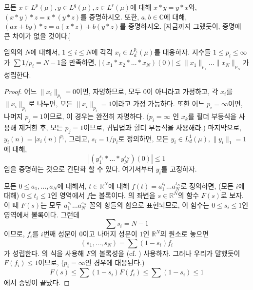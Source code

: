 \begin{exercise}
    모든 $x \in L^p(\mu), y \in L^q(\mu), z \in L^r(\mu)$에 대해 $x * y = y * x$와, $(x * y) * z = x * (y * z)$를 증명하시오.
    또한, $a, b \in \mathbb{C}$에 대해, $(ax + by) * z = a (x * z) + b (y * z)$를 증명하시오. [지금까지 그랬듯이, 증명에 큰 차이가 없을 것이다.]
\end{exercise}

\begin{lemma}
\label{lem:youngineq2}
    임의의 $N$에 대해서, $1 \leq i \leq N$에 각각 $x_i \in L^{p_i}_d(\mu)$를 대응하자.
    지수들 $1 \leq p_i \leq \infty$가 $\sum 1/p_i = N - 1$을 만족하면, $|(x_1 * x_2 * \dots * x_N)(0)| \leq \|x_1\|_{p_1} \dots \|x_N\|_{p_N}$가 성립한다.
\end{lemma}
\begin{proof}
    어느 $\|x_i\|_{p_i} = 0$이면, 자명하므로, 모두 $0$이 아니라고 가정하고, 각 $x_i$를 $\|x_i\|_{p_i}$로 나누면, 모든 $\|x_i\|_{p_i} = 1$이라고 가정 가능하다.
    또한 어느 $p_i = \infty$이면, 나머지 $p_j = 1$이므로, 이 경우는 완전히 자명하다. ($p_i = \infty$ 인 $x_k$를 횔더 부등식을 사용해 제거한 후, 모든 $p_j = 1$이므로, 귀납법과 횔더 부등식을 사용해라.)
    마지막으로, $y_i(n) = |x_i(n)|^{p_i}$, 그리고, $s_i = 1/p_i$로 정의하면, 모든 $y_i \in L^1_d(\mu), \|y_i\|_1 = 1$에 대해,
    \begin{equation}
    \label{eq:youngineq1}
        |(y_1^{s_1} * \dots * y_N^{s_N})(0)| \leq 1
    \end{equation}
    임을 증명하는 것으로 간단화 할 수 있다.
    여기서부터 $y_i$를 고정하자.
    
    모든 $0 \leq a_1, \dots, a_N$에 대해서, $t \in \mathbb{R}^N$에 대해 $f(t) = a_1^{t_1} \dots a_N^{t_N}$로 정의하면, (모든 $i$에 대해) $0 \leq t_i \leq 1$인 영역에서 $f$는 볼록이다.
    의 좌변을 $s \in \mathbb{R}^N$의 함수 $F(s)$로 보자.
    이 때 $F(s)$는 모두 $a_1^{s_1} \dots a_N^{s_N}$ 꼴의 항들의 합으로 표현되므로, 이 함수는 $0 \leq s_i \leq 1$인 영역에서 볼록이다.
    그런데
    \begin{equation*}
        \sum s_i = N - 1
    \end{equation*}
    이므로, $f_i$를 $i$번째 성분이 $0$이고 나머지 성분이 $1$인 $\mathbb{R}^N$의 원소로 놓으면
    \begin{equation}
    \label{eq:youngineq2}
        (s_1, \dots, s_N) = \sum (1 - s_i) f_i
    \end{equation}
    가 성립한다.
    의 식을 사용해 $F$의 볼록성을 (cf. ) 사용하자.
    그러나 우리가 말했듯이 $F(f_i) \leq 1$이므로, ($p_i = \infty$인 경우에 대응된다.)
    \begin{equation*}
        F(s) \leq \sum (1 - s_i) F(f_i) \leq \sum (1 - s_i) \leq 1
    \end{equation*}
    에서 증명이 끝났다.
\end{proof}

